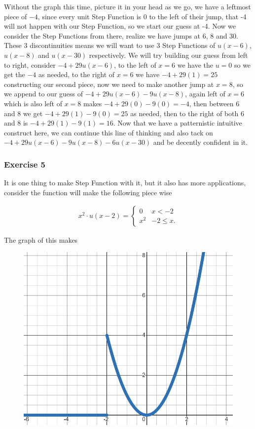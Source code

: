 \documentclass[12pt]{article}
\begin{document}
Without the graph this time, picture it in your head as we go, we have a leftmost piece of $-4$, since every unit Step Function is 0 to the left of their jump, that -4 will not happen with our Step Function, so we start our guess at -4. Now we consider the Step Functions from there, realize we have jumps at 6, 8 and 30. These 3 discontinuities means we will want to use 3 Step Functions of $u(x-6)$, $u(x-8)$ and $u(x-30)$ respectively. We will try building our guess from left to right, consider $-4+29u(x-6)$, to the left of $x=6$ we have the $u=0$ so we get the $-4$ as needed, to the right of $x=6$ we have $-4+29(1)=25$ constructing our second piece, now we need to make another jump at $x=8$, so we append to our guess of $-4+29u(x-6)-9u(x-8)$, again left of $x=6$ which is also left of $x=8$ makes $-4+29(0)-9(0)=-4$, then between 6 and 8 we get $-4+29(1)-9(0)=25$ as needed, then to the right of both 6 and 8 is $-4+29(1)-9(1)=16$. Now that we have a patternistic intuitive construct here, we can continue this line of thinking and also tack on $-4+29u(x-6)-9u(x-8)-6u(x-30)$ and be decently confident in it.

\subsubsection{Exercise 5}

It is one thing to make Step Function with it, but it also has more applications, consider the function will make the following piece wise 

\begin{align*}
    x^2\cdot u(x-2) = \left\{
        \begin{array}{cc}
            0 & x < -2  \\
            x^2 & -2 \leq x. 
        \end{array}
    \right.
\end{align*}

The graph of this makes

\pagebreak

\begin{figure}[!htbp]
\centering
\includegraphics[scale=.5]{step4.PNG}
\label{fig:hsf4}
\end{figure}
\end{document}
